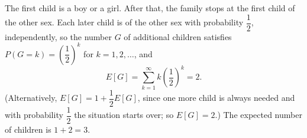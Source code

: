 The first child is a boy or a girl. After that, the family stops at the first child of the other sex. Each later child is of the other sex with probability $\dfrac12$, independently, so the number $G$ of additional children satisfies $P(G=k)=\left(\dfrac12\right)^k$ for $k=1,2,\dots$, and
\[E[G]=\sum_{k=1}^{\infty}k\left(\dfrac12\right)^k=2.\]
(Alternatively, $E[G]=1+\dfrac12E[G]$, since one more child is always needed and with probability $\dfrac12$ the situation starts over; so $E[G]=2$.) The expected number of children is $1+2=\boxed{3}$.
